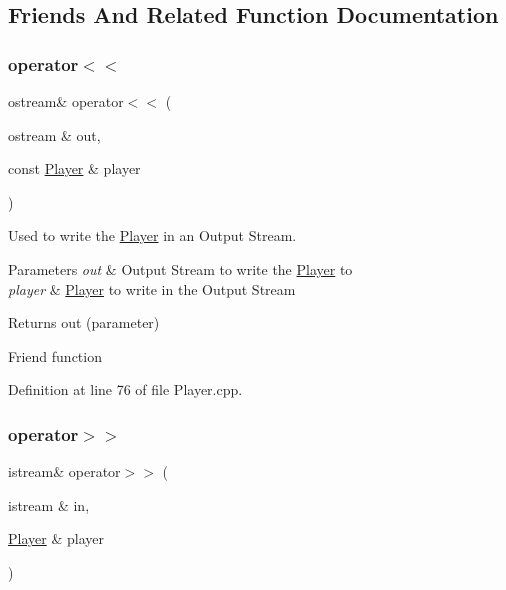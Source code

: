 \subsection{Friends And Related Function Documentation}
\hypertarget{class_player_a7429373489b5ccfffc0c6f7d3b237b06}{}\label{class_player_a7429373489b5ccfffc0c6f7d3b237b06} 
\subsubsection{\texorpdfstring{operator$<$$<$}{operator<<}}
{\footnotesize\ttfamily ostream\& operator$<$$<$ (\begin{DoxyParamCaption}\item[{ostream \&}]{out,  }\item[{const \hyperlink{class_player}{Player} \&}]{player }\end{DoxyParamCaption})\hspace{0.3cm}{\ttfamily [friend]}}



Used to write the \hyperlink{class_player}{Player} in an Output Stream. 


\begin{DoxyParams}{Parameters}
{\em out} & Output Stream to write the \hyperlink{class_player}{Player} to \\
\hline
{\em player} & \hyperlink{class_player}{Player} to write in the Output Stream \\
\hline
\end{DoxyParams}
\begin{DoxyReturn}{Returns}
out (parameter)
\end{DoxyReturn}
Friend function 

Definition at line 76 of file Player.\+cpp.

\hypertarget{class_player_ac80a9cf20cbee01df8046ca9497b0b2d}{}\label{class_player_ac80a9cf20cbee01df8046ca9497b0b2d} 
\subsubsection{\texorpdfstring{operator$>$$>$}{operator>>}}
{\footnotesize\ttfamily istream\& operator$>$$>$ (\begin{DoxyParamCaption}\item[{istream \&}]{in,  }\item[{\hyperlink{class_player}{Player} \&}]{player }\end{DoxyParamCaption})\hspace{0.3cm}{\ttfamily [friend]}}



